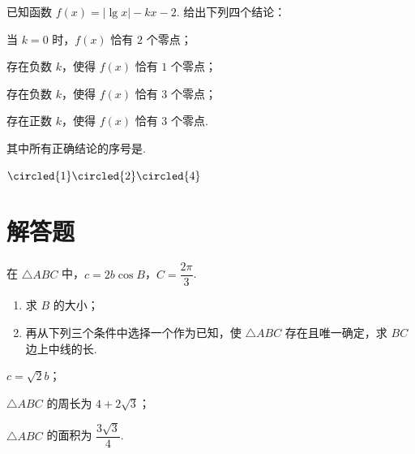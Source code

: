 \begin{problem}
已知函数 \(f(x)=|\lg x|-kx-2\). 给出下列四个结论：

\begin{circlelist}
\item 当 \(k=0\) 时，\(f(x)\) 恰有 \(2\) 个零点；

\item 存在负数 \(k\)，使得 \(f(x)\) 恰有 \(1\) 个零点；

\item 存在负数 \(k\)，使得 \(f(x)\) 恰有 \(3\) 个零点；

\item 存在正数 \(k\)，使得 \(f(x)\) 恰有 \(3\) 个零点.
\end{circlelist}

其中所有正确结论的序号是\fillinblank{}.
\end{problem}

\begin{answer}
\(\circled{1}\circled{2}\circled{4}\)
\end{answer}

\section{解答题}

\begin{problem}
在 \(\triangle ABC\) 中，\(c=2b\cos B\)，\(C=\dfrac{2\pi}{3}\).

\begin{enumerate}
    \item 求 \(B\) 的大小；
    \item 再从下列三个条件中选择一个作为已知，使 \(\triangle ABC\) 存在且唯一确定，求 \(BC\) 边上中线的长.
\end{enumerate}

\begin{circlelist}
\item \(c=\sqrt2b\)；

\item \(\triangle ABC\) 的周长为 \(4+2\sqrt3\)；

\item \(\triangle ABC\) 的面积为 \(\dfrac{3\sqrt3}{4}\).
\end{circlelist}
\end{problem}

